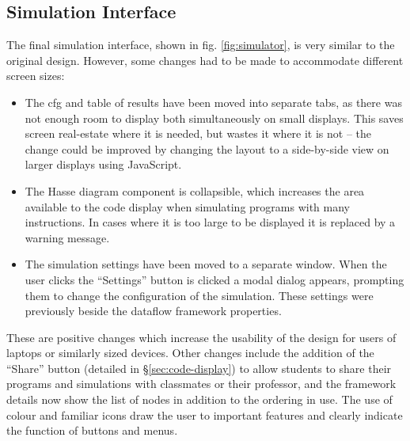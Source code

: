\documentclass[bsc,twoside,singlespacing,parskip,logo,notimes,normalheadings]{infthesis}
\begin{document}
        \subsection{Simulation Interface}


        The final simulation interface, shown in
        fig. \ref{fig:simulator}, is very similar to the original
        design. However, some changes had to be made to accommodate
        different screen sizes:
        
        \begin{itemize}
        \item The \gls{cfg} and table of results have been moved into
          separate tabs, as there was not enough room to display both
          simultaneously on small displays. This saves screen
          real-estate where it is needed, but wastes it where it is
          not -- the change could be improved by changing the layout
          to a side-by-side view on larger displays using JavaScript.
        \item The Hasse diagram component is collapsible, which
          increases the area available to the code display when
          simulating programs with many instructions. In cases where
          it is too large to be displayed it is replaced by a warning
          message.
        \item The simulation settings have been moved to a separate
          window. When the user clicks the ``Settings'' button is
          clicked a modal dialog appears, prompting them to change the
          configuration of the simulation. These settings were
          previously beside the \gls{dataflow} framework properties.
        \end{itemize}

        These are positive changes which increase the usability of the
        design for users of laptops or similarly sized devices. Other
        changes include the addition of the ``Share'' button (detailed
        in \S\ref{sec:code-display}) to allow students to share their
        programs and simulations with classmates or their professor,
        and the framework details now show the list of nodes in
        addition to the ordering in use. The use of colour and
        familiar icons draw the user to important features and clearly
        indicate the function of buttons and menus.
\end{document}
